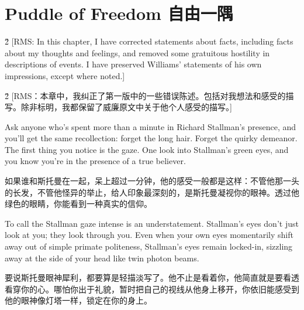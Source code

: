 \chapter{\ifdefined\eng
Puddle of Freedom
\fi
\ifdefined\chs
自由一隅
\fi}
\ifdefined\eng
\ifdefined\v2
[RMS: In this chapter, I have corrected statements about facts, including facts about my thoughts and feelings, and removed some gratuitous hostility in descriptions of events.  I have preserved Williams' statements of his own impressions, except where noted.]
\fi
\fi

\ifdefined\chs
\ifdefined\v2
[RMS：本章中，我纠正了第一版中的一些错误陈述。包括对我想法和感受的描写。除非标明，我都保留了威廉原文中关于他个人感受的描写。]
\fi
\fi

\ifdefined\eng
Ask anyone who's spent more than a minute in Richard Stallman's presence, and you'll get the same recollection: forget the long hair. Forget the quirky demeanor. The first thing you notice is the gaze. One look into Stallman's green eyes, and you know you're in the presence of a true believer.
\fi

\ifdefined\chs
如果谁和斯托曼在一起，呆上超过一分钟，他的感受一般都是这样：不管他那一头的长发，不管他怪异的举止，给人印象最深刻的，是斯托曼凝视你的眼神。透过他绿色的眼睛，你能看到一种真实的信仰。
\fi

\ifdefined\eng
To call the Stallman gaze intense is an understatement. Stallman's eyes don't just look at you; they look through you. Even when your own eyes momentarily shift away out of simple primate politeness, Stallman's eyes remain locked-in, sizzling away at the side of your head like twin photon beams.
\fi

\ifdefined\chs
要说斯托曼眼神犀利，都要算是轻描淡写了。他不止是看着你，他简直就是要看透看穿你的心。哪怕你出于礼貌，暂时把自己的视线从他身上移开，你依旧能感受到他的眼神像灯塔一样，锁定在你的身上。
\fi


